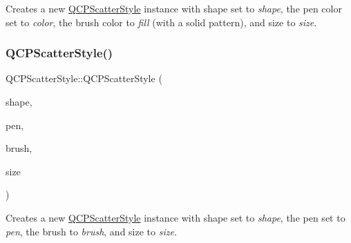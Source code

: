 Creates a new \mbox{\hyperlink{class_q_c_p_scatter_style}{Q\+C\+P\+Scatter\+Style}} instance with shape set to {\itshape shape}, the pen color set to {\itshape color}, the brush color to {\itshape fill} (with a solid pattern), and size to {\itshape size}. \mbox{\label{class_q_c_p_scatter_style_a85acc4941d7e5c9bca5fa51377a77f49}} 
\subsubsection{\texorpdfstring{Q\+C\+P\+Scatter\+Style()}{QCPScatterStyle()}\hspace{0.1cm}{\footnotesize\ttfamily [5/7]}}
{\footnotesize\ttfamily Q\+C\+P\+Scatter\+Style\+::\+Q\+C\+P\+Scatter\+Style (\begin{DoxyParamCaption}\item[{\mbox{\hyperlink{class_q_c_p_scatter_style_adb31525af6b680e6f1b7472e43859349}{Scatter\+Shape}}}]{shape,  }\item[{const Q\+Pen \&}]{pen,  }\item[{const Q\+Brush \&}]{brush,  }\item[{double}]{size }\end{DoxyParamCaption})}

Creates a new \mbox{\hyperlink{class_q_c_p_scatter_style}{Q\+C\+P\+Scatter\+Style}} instance with shape set to {\itshape shape}, the pen set to {\itshape pen}, the brush to {\itshape brush}, and size to {\itshape size}.

